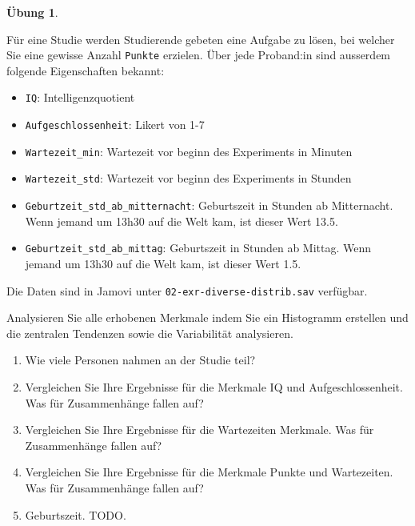 \documentclass[
]{book}
\providecommand{\tightlist}{%
  \setlength{\itemsep}{0pt}\setlength{\parskip}{0pt}}
\theoremstyle{definition}
\theoremstyle{definition}
\theoremstyle{definition}
\newtheorem{exercise}{Übung}[chapter]
\theoremstyle{definition}
\theoremstyle{remark}
\begin{document}
\begin{exercise}
\protect\hypertarget{exr:diverse-distrib}{}\label{exr:diverse-distrib}\leavevmode

Für eine Studie werden Studierende gebeten eine Aufgabe zu lösen, bei welcher Sie eine gewisse Anzahl \texttt{Punkte} erzielen. Über jede Proband:in sind ausserdem folgende Eigenschaften bekannt:

\begin{itemize}
\tightlist
\item
  \texttt{IQ}: Intelligenzquotient
\item
  \texttt{Aufgeschlossenheit}: Likert von 1-7
\item
  \texttt{Wartezeit\_min}: Wartezeit vor beginn des Experiments in Minuten
\item
  \texttt{Wartezeit\_std}: Wartezeit vor beginn des Experiments in Stunden
\item
  \texttt{Geburtzeit\_std\_ab\_mitternacht}: Geburtszeit in Stunden ab Mitternacht. Wenn jemand um 13h30 auf die Welt kam, ist dieser Wert 13.5.
\item
  \texttt{Geburtzeit\_std\_ab\_mittag}: Geburtszeit in Stunden ab Mittag. Wenn jemand um 13h30 auf die Welt kam, ist dieser Wert 1.5.
\end{itemize}

Die Daten sind in Jamovi unter \texttt{02-exr-diverse-distrib.sav} verfügbar.

Analysieren Sie alle erhobenen Merkmale indem Sie ein Histogramm erstellen und die zentralen Tendenzen sowie die Variabilität analysieren.

\begin{enumerate}
\def\labelenumi{\alph{enumi}.}
\tightlist
\item
  Wie viele Personen nahmen an der Studie teil?
\item
  Vergleichen Sie Ihre Ergebnisse für die Merkmale IQ und Aufgeschlossenheit. Was für Zusammenhänge fallen auf?
\item
  Vergleichen Sie Ihre Ergebnisse für die Wartezeiten Merkmale. Was für Zusammenhänge fallen auf?
\item
  Vergleichen Sie Ihre Ergebnisse für die Merkmale Punkte und Wartezeiten. Was für Zusammenhänge fallen auf?
\item
  Geburtszeit. TODO.
\end{enumerate}

\end{exercise}
\end{document}
